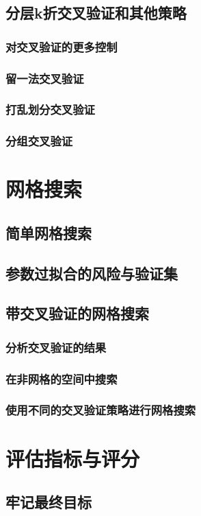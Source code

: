\subsection{分层k折交叉验证和其他策略}
\subsubsection{对交叉验证的更多控制}
\subsubsection{留一法交叉验证}
\subsubsection{打乱划分交叉验证}
\subsubsection{分组交叉验证}
\section{网格搜索}
\subsection{简单网格搜索}
\subsection{参数过拟合的风险与验证集}
\subsection{带交叉验证的网格搜索}
\subsubsection{分析交叉验证的结果}
\subsubsection{在非网格的空间中搜索}
\subsubsection{使用不同的交叉验证策略进行网格搜索}
\section{评估指标与评分}
\subsection{牢记最终目标}
